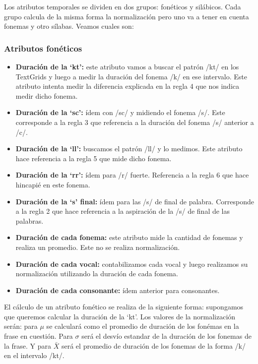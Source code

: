 
Los atributos temporales se dividen en dos grupos: fonéticos y silábicos. Cada grupo calcula de la misma forma la normalización pero uno va a tener en cuenta fonemas y otro sílabas. Veamos cuales son:

\subsubsection{Atributos fonéticos}

\begin{itemize}
    \item \textbf{Duración de la `kt’:} este atributo vamos a buscar el patrón /kt/ en los TextGrids y luego a medir la duración del fonema /k/ en ese intervalo. Este atributo intenta medir la diferencia explicada en la regla 4 que nos indica medir dicho fonema.
    \item \textbf{Duración de la `sc’:} ídem con /sc/ y midiendo el fonema /s/. Este corresponde a la regla 3 que referencia a la duración del fonema /s/ anterior a /c/.  
    \item \textbf{Duración de la `ll’:} buscamos el patrón /ll/ y lo medimos. Este atributo hace referencia a la regla 5 que mide dicho fonema.
    \item \textbf{Duración de la `rr’:} ídem para /r/ fuerte. Referencia a la regla 6 que hace hincapié en este fonema.
    \item \textbf{Duración de la `s’ final:} ídem para las /s/ de final de palabra. Corresponde a la regla 2 que hace referencia a la aspiración de la /s/ de final de las palabras.  
    \item \textbf{Duración de cada fonema:} este atributo mide la cantidad de fonemas y realiza un promedio. Este no se realiza normalización.  
    \item \textbf{Duración de cada vocal:} contabilizamos cada vocal y luego realizamos su normalización utilizando la duración de cada fonema.
    \item \textbf{Duración de cada consonante:} ídem anterior para consonantes. 
\end{itemize}

El cálculo de un atributo fonético se realiza de la siguiente forma: supongamos que queremos calcular la duración de la `kt’. Los valores de la normalización serán: para $\mu$ se calculará como el promedio de duración de los fonémas en la frase en cuestión. Para $\sigma$ será el desvío estandar de la duración de los fonemas de la frase. Y para $\bar{X}$ será el promedio de duración de los fonemas de la forma /k/ en el intervalo /kt/.

